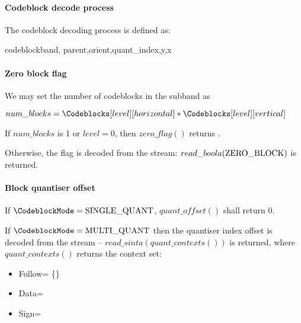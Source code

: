 \paragraph{Codeblock decode process\newline}

The codeblock decoding process is defined as:

\begin{pseudo}{codeblock}{band, parent,orient,quant\_index,y,x}
    \bsEND
  \bsEND
\bsELSE
    \bsEND
  \bsEND

\bsEND

\end{pseudo}

\paragraph{Zero block flag\newline}
\label{zeroblockflag}

We may set the number of codeblocks in the subband as

$num\_blocks = \Codeblocks[level][horizontal]*\Codeblocks[level][vertical]$

If $num\_blocks$ is 1 or $level=0$, then $zero\_flag()$ returns \false.

Otherwise, the flag is decoded from the stream: $read\_boola(\text{ZERO\_BLOCK})$
is returned.

\paragraph{Block quantiser offset\newline}
\label{blockquantidx}

If $\CodeblockMode=\SingleQuantiser$,  $quant\_offset()$ shall return 0.

If $\CodeblockMode=\MultipleQuantiser$ then the quantiser index offset
is decoded from the stream -- $read\_sinta(quant\_contexts())$ is returned, where
$quant\_contexts()$ returns the context set:

\begin{itemize}
\item{Follow= \{\QOffsetFollow\}}
\item{Data=\QOffsetInfo}
\item{Sign=\QOffsetSign}
\end{itemize}

